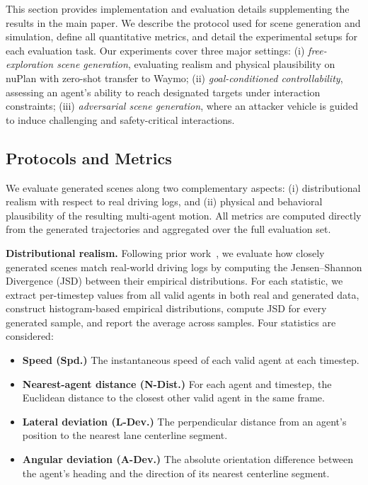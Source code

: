 \documentclass[10pt,twocolumn,letterpaper]{article}
\theoremstyle{plain}
\theoremstyle{remark}
\renewcommand{\paragraph}[1]{\vspace{.5em}\noindent\textbf{#1.}}
\begin{document}
This section provides implementation and evaluation details
supplementing the results in the main paper.
We describe the protocol used for scene generation and
simulation, define all quantitative metrics, and detail the
experimental setups for each evaluation task.
Our experiments cover three major settings: 
(i) \textit{free-exploration scene generation}, evaluating realism
and physical plausibility on nuPlan with zero-shot transfer to
Waymo;
(ii) \textit{goal-conditioned controllability}, assessing an agent's
ability to reach designated targets under interaction constraints;
(iii) \textit{adversarial scene generation}, where an attacker
vehicle is guided to induce challenging and safety-critical
interactions.



\subsection{Protocols and Metrics}
\label{sec:protocols_metrics}

We evaluate generated scenes along two complementary aspects:
(i) distributional realism with respect to real driving logs, and
(ii) physical and behavioral plausibility of the resulting
multi-agent motion.  
All metrics are computed directly from the generated trajectories
and aggregated over the full evaluation set.

\paragraph{Distributional realism}
Following prior work~\cite{rowe2025scenario, lu2024scenecontrol}, we evaluate how closely
generated scenes match real-world driving logs by computing the
Jensen--Shannon Divergence (JSD) between their empirical
distributions.  
For each statistic, we extract per-timestep values from all valid
agents in both real and generated data, construct histogram-based
empirical distributions, compute JSD for every generated sample,
and report the average across samples.  
Four statistics are considered:

\begin{itemize}
    \item \textbf{Speed (Spd.)}  
    The instantaneous speed of each valid agent at each timestep.

    \item \textbf{Nearest-agent distance (N-Dist.)}  
    For each agent and timestep, the Euclidean distance to the
    closest other valid agent in the same frame.

    \item \textbf{Lateral deviation (L-Dev.)}  
    The perpendicular distance from an agent's position to the
    nearest lane centerline segment.

    \item \textbf{Angular deviation (A-Dev.)}  
    The absolute orientation difference between the agent’s heading
    and the direction of its nearest centerline segment.
\end{itemize}
\end{document}
